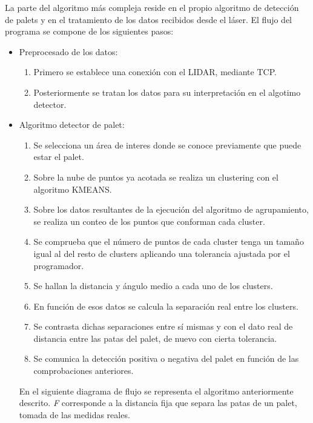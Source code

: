 
La parte del algoritmo más compleja reside en el propio algoritmo de detección de palets y en el tratamiento de los datos recibidos desde el láser.
El flujo del programa se compone de los siguientes pasos:
\begin{itemize}
	\item Preprocesado de los datos: \\
	\begin{enumerate}
		\item Primero se establece una conexión con el LIDAR, mediante TCP.
		\item Posteriormente se tratan los datos para su interpretación en el algotimo detector.
	\end{enumerate}
	\item Algoritmo detector de palet: \\
	\begin{enumerate}
		\item Se selecciona un área de interes donde se conoce previamente que puede estar el palet.
		\item Sobre la nube de puntos ya acotada se realiza un clustering con el algoritmo KMEANS.
		\item Sobre los datos resultantes de la ejecución del algoritmo de agrupamiento, se realiza un conteo de los puntos que conforman cada cluster.
		\item Se comprueba que el número de puntos de cada cluster tenga un tamaño igual al del resto de clusters aplicando una tolerancia ajustada por el programador.
		\item Se hallan la distancia y ángulo medio a cada uno de los clusters.
		\item En función de esos datos se calcula la separación real entre los clusters.
		\item Se contrasta dichas separaciones entre sí mismas y con el dato real de distancia entre las patas del palet, de nuevo con cierta tolerancia.
		\item Se comunica la detección positiva o negativa del palet en función de las comprobaciones anteriores.


	\end{enumerate}
En el siguiente diagrama de flujo se representa el algoritmo anteriormente descrito. \emph{F} corresponde a la distancia fija que separa las patas de un palet, tomada de las medidas reales.
	\end{itemize}

